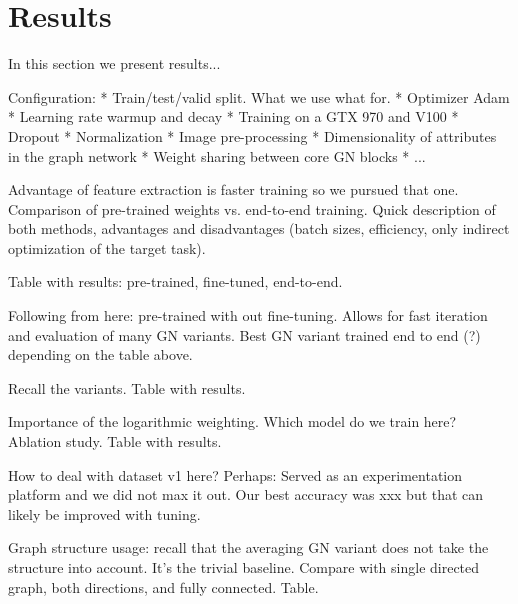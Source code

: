 \section{Results}

In this section we present results...

Configuration:
* Train/test/valid split. What we use what for.
* Optimizer Adam
* Learning rate warmup and decay
* Training on a GTX 970 and V100
* Dropout
* Normalization
* Image pre-processing
* Dimensionality of attributes in the graph network
* Weight sharing between core GN blocks
* ...

Advantage of feature extraction is faster training so we pursued that one. Comparison of pre-trained weights vs. end-to-end training. Quick description of both methods, advantages and disadvantages (batch sizes, efficiency, only indirect optimization of the target task).

Table with results: pre-trained, fine-tuned, end-to-end.

Following from here: pre-trained with out fine-tuning. Allows for fast iteration and evaluation of many GN variants. Best GN variant trained end to end (?) depending on the table above.

Recall the variants. Table with results.

Importance of the logarithmic weighting. Which model do we train here? Ablation study. Table with results.

How to deal with dataset v1 here? Perhaps: Served as an experimentation platform and we did not max it out. Our best accuracy was xxx but that can likely be improved with tuning.

Graph structure usage: recall that the averaging GN variant does not take the structure into account. It's the trivial baseline. Compare with single directed graph, both directions, and fully connected. Table.
